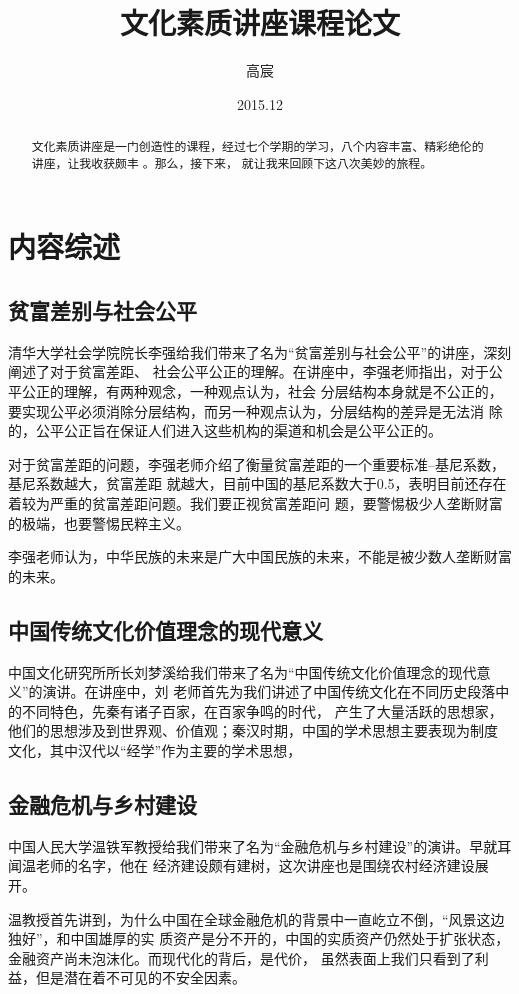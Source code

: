 \documentclass[a4paper]{cctart}
\title{文化素质讲座课程论文}
\author{高宸}
\date{2015.12}
\affil{电子工程系~无22班~2012011027}
\numberwithin{equation}{section} \pagestyle{fancy}
\begin{document}
\maketitle
\begin{abstract}
文化素质讲座是一门创造性的课程，经过七个学期的学习，八个内容丰富、精彩绝伦的讲座，让我收获颇丰
。那么，接下来，
就让我来回顾下这八次美妙的旅程。
\end{abstract}

\section{内容综述}\label{1}
\subsection{贫富差别与社会公平}
清华大学社会学院院长李强给我们带来了名为“贫富差别与社会公平”的讲座，深刻阐述了对于贫富差距、
社会公平公正的理解。在讲座中，李强老师指出，对于公平公正的理解，有两种观念，一种观点认为，社会
分层结构本身就是不公正的，要实现公平必须消除分层结构，而另一种观点认为，分层结构的差异是无法消
除的，公平公正旨在保证人们进入这些机构的渠道和机会是公平公正的。

对于贫富差距的问题，李强老师介绍了衡量贫富差距的一个重要标准--基尼系数，基尼系数越大，贫富差距
就越大，目前中国的基尼系数大于0.5，表明目前还存在着较为严重的贫富差距问题。我们要正视贫富差距问
题，要警惕极少人垄断财富的极端，也要警惕民粹主义。

李强老师认为，中华民族的未来是广大中国民族的未来，不能是被少数人垄断财富的未来。
\subsection{中国传统文化价值理念的现代意义}
中国文化研究所所长刘梦溪给我们带来了名为“中国传统文化价值理念的现代意义”的演讲。在讲座中，刘
老师首先为我们讲述了中国传统文化在不同历史段落中的不同特色，先秦有诸子百家，在百家争鸣的时代，
产生了大量活跃的思想家，他们的思想涉及到世界观、价值观；秦汉时期，中国的学术思想主要表现为制度
文化，其中汉代以“经学”作为主要的学术思想，

\subsection{金融危机与乡村建设}
中国人民大学温铁军教授给我们带来了名为“金融危机与乡村建设”的演讲。早就耳闻温老师的名字，他在
经济建设颇有建树，这次讲座也是围绕农村经济建设展开。

温教授首先讲到，为什么中国在全球金融危机的背景中一直屹立不倒，“风景这边独好”，和中国雄厚的实
质资产是分不开的，中国的实质资产仍然处于扩张状态，金融资产尚未泡沫化。而现代化的背后，是代价，
虽然表面上我们只看到了利益，但是潜在着不可见的不安全因素。
\end{document}
